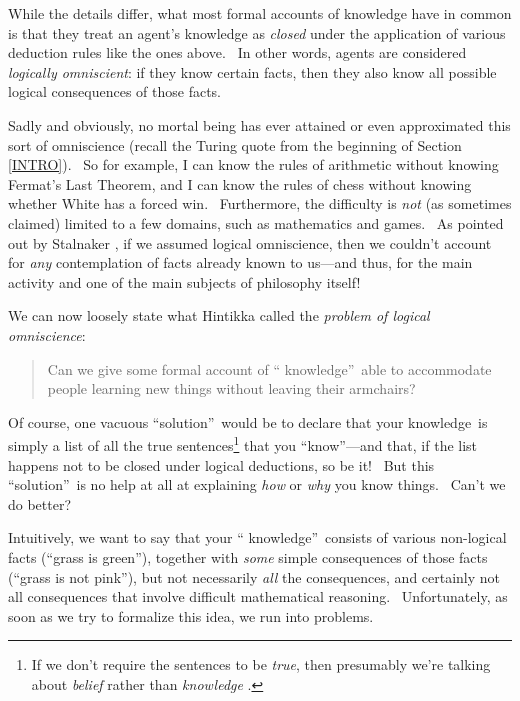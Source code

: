 \documentclass[11pt,onecolumn]{article}%
\begin{document}
While the details differ, what most formal accounts of knowledge have in
common is that they treat an agent's knowledge as \textit{closed} under the
application of various deduction rules like the ones above. \ In other words,
agents are considered \textit{logically omniscient}: if they know certain
facts, then they also know all possible logical consequences of those facts.

Sadly and obviously, no mortal being has ever attained or even approximated
this sort of omniscience (recall the Turing quote from the beginning of
Section \ref{INTRO}). \ So for example, I can know the rules of arithmetic
without knowing Fermat's Last Theorem, and I can know the rules of chess
without knowing whether White has a forced win. \ Furthermore, the difficulty
is \textit{not} (as sometimes claimed) limited to a few domains, such as
mathematics and games. \ As pointed out by Stalnaker \cite{stalnaker}, if we
assumed logical omniscience, then we couldn't account for \textit{any}
contemplation of facts already known to us---and thus, for the main activity
and one of the main subjects of philosophy itself!

We can now loosely state what Hintikka \cite{hintikka} called the
\textit{problem of logical omniscience}:

\begin{quotation}
\noindent Can we give some formal account of \textquotedblleft
knowledge\textquotedblright\ able to accommodate people learning new things
without leaving their armchairs?
\end{quotation}

Of course, one vacuous \textquotedblleft solution\textquotedblright\ would be
to declare that your knowledge\ is simply a list of all the true
sentences\footnote{If we don't require the sentences to be \textit{true}, then
presumably we're talking about \textit{belief} rather than \textit{knowledge}%
.} that you \textquotedblleft know\textquotedblright---and that, if the list
happens not to be closed under logical deductions, so be it! \ But this
\textquotedblleft solution\textquotedblright\ is no help at all at explaining
\textit{how} or \textit{why} you know things. \ Can't we do better?

Intuitively, we want to say that your \textquotedblleft
knowledge\textquotedblright\ consists of various non-logical facts
(\textquotedblleft grass is green\textquotedblright), together with
\textit{some} simple consequences of those facts (\textquotedblleft grass is
not pink\textquotedblright), but not necessarily \textit{all} the
consequences, and certainly not all consequences that involve difficult
mathematical reasoning. \ Unfortunately, as soon as we try to formalize this
idea, we run into problems.
\end{document}
